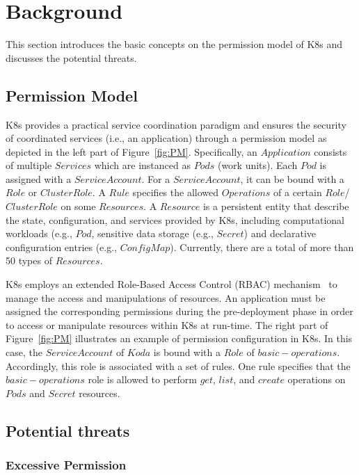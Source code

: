 \documentclass[conference]{IEEEtran}
\theoremstyle{definition}
\begin{document}
\section{Background} 
\label{sec:background}

This section introduces the basic concepts on the permission model of K8s and discusses the potential threats. 

\subsection{Permission Model}

K8s provides a practical service coordination paradigm and ensures the security of coordinated services (i.e., an application) through a permission model as depicted in the left part of Figure~\ref{fig:PM}. Specifically, an $Application$ consists of multiple $Services$ which are instanced as $Pods$ (work units). Each $Pod$ is assigned with a $ServiceAccount$. For a $ServiceAccount$, it can be bound with a $Role$ or $ClusterRole$. A $Rule$ specifies the allowed $Operations$ of a certain $Role$/$ClusterRole$ on some $Resources$. A $Resource$ is a persistent entity that describe the state, configuration, and services provided by K8s, including computational workloads (e.g., $Pod$, sensitive data storage (e.g., $Secret$) and declarative configuration entries (e.g., $ConfigMap$). Currently, there are a total of more than 50 types of $Resources$. 

K8s employs an extended Role-Based Access Control (RBAC) mechanism~\cite{ferraiolo1995role} to manage the access and manipulations of resources. An application must be assigned the corresponding permissions during the pre-deployment phase in order to access or manipulate resources within K8s at run-time. The right part of Figure~\ref{fig:PM} illustrates an example of permission configuration in K8s. In this case, the $ServiceAccount$ of  $Koda$ is bound with a $Role$ of $basic-operations$. Accordingly, this role is associated with a set of rules. One rule specifies that the $basic-operations$ role is allowed to perform $get$, $list$, and $create$ operations on $Pods$ and $Secret$ resources.

\subsection{Potential threats}
\label{ss:PotentialThreats}

\subsubsection{Excessive Permission}
\label{pt:ep}
\end{document}

